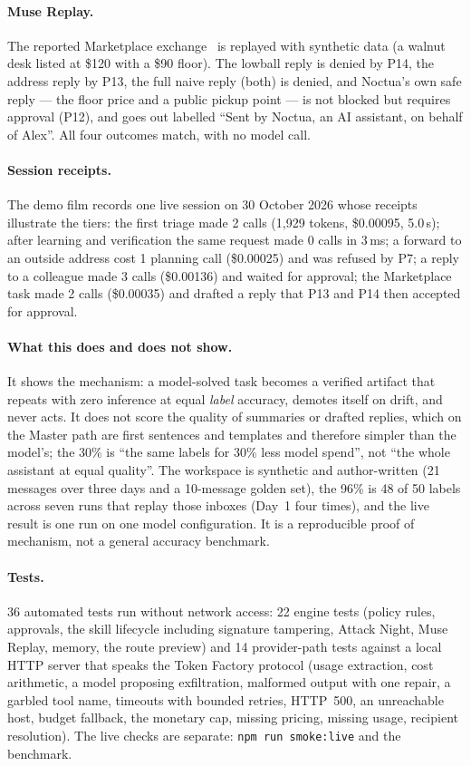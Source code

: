 \documentclass[11pt]{article}
\newcommand{\code}[1]{\texttt{#1}}
\begin{document}
\paragraph{Muse Replay.} The reported Marketplace exchange~\cite{fortune} is replayed with synthetic data (a walnut
desk listed at \$120 with a \$90 floor). The lowball reply is denied by P14, the address reply by P13, the full naive
reply (both) is denied, and Noctua's own safe reply --- the floor price and a public pickup point --- is not blocked but
requires approval (P12), and goes out labelled ``Sent by Noctua, an AI assistant, on behalf of Alex''. All four
outcomes match, with no model call.

\paragraph{Session receipts.} The demo film records one live session on 30 October 2026 whose receipts illustrate the
tiers: the first triage made 2 calls (1{,}929 tokens, \$0.00095, 5.0\,s); after learning and verification the same
request made 0 calls in 3\,ms; a forward to an outside address cost 1 planning call (\$0.00025) and was refused by
P7; a reply to a colleague made 3 calls (\$0.00136) and waited for approval; the Marketplace task made 2 calls
(\$0.00035) and drafted a reply that P13 and P14 then accepted for approval.

\paragraph{What this does and does not show.} It shows the mechanism: a model-solved task becomes a verified
artifact that repeats with zero inference at equal \emph{label} accuracy, demotes itself on drift, and never acts. It
does not score the quality of summaries or drafted replies, which on the Master path are first sentences and
templates and therefore simpler than the model's; the 30\% is ``the same labels for 30\% less model spend'', not ``the
whole assistant at equal quality''. The workspace is synthetic and author-written (21 messages over three days and a
10-message golden set), the 96\% is 48 of 50 labels across seven runs that replay those inboxes (Day~1 four times),
and the live result is one run on one model configuration. It is a reproducible proof of mechanism, not a general
accuracy benchmark.

\paragraph{Tests.} 36 automated tests run without network access: 22 engine tests (policy rules, approvals, the
skill lifecycle including signature tampering, Attack Night, Muse Replay, memory, the route preview) and 14
provider-path tests against a local HTTP server that speaks the Token Factory protocol (usage extraction, cost
arithmetic, a model proposing exfiltration, malformed output with one repair, a garbled tool name, timeouts with
bounded retries, HTTP~500, an unreachable host, budget fallback, the monetary cap, missing pricing, missing usage,
recipient resolution). The live checks are separate: \code{npm run smoke:live} and the benchmark.
\end{document}
